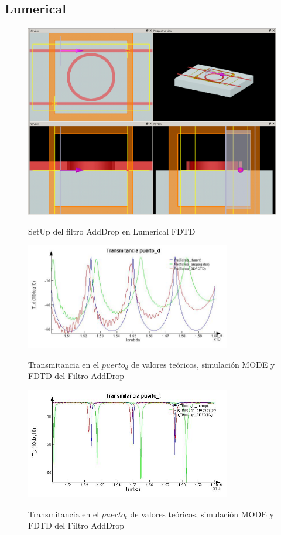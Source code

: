 \subsection{Lumerical}
\label{ss:lumerical}

\begin{figure}[h!]
\caption{SetUp del filtro AddDrop en Lumerical FDTD}
\centering
\includegraphics[width=1.0\textwidth,natwidth=1074,natheight=808]{figs/lum_setup_ad.PNG}
\label{fig:lum_setup_ad}
\end{figure} 

\begin{figure}[h!]
\caption{Transmitancia en el $puerto_d$ de valores teóricos, simulación MODE y 
FDTD del Filtro AddDrop}
\centering
\includegraphics[width=0.8\textwidth,natwidth=690,natheight=356]{figs/lum_Td.jpg}
\label{fig:lum_td_ad}
\end{figure} 

\begin{figure}[h!]
\caption{Transmitancia en el $puerto_t$ de valores teóricos, simulación MODE y 
FDTD del Filtro AddDrop}
\centering
\includegraphics[width=0.8\textwidth,natwidth=659,natheight=356]{figs/lum_Tt.jpg}
\label{fig:lum_tt_ad}
\end{figure} 

